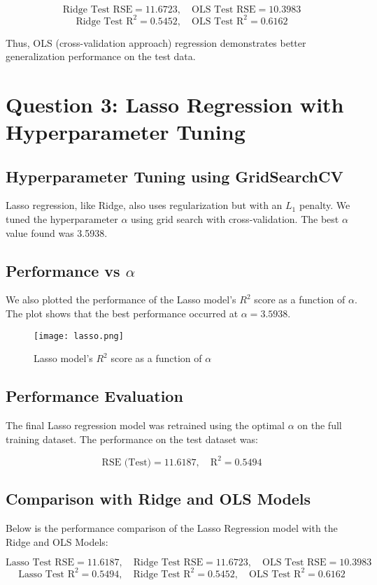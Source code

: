 \documentclass[a4paper,12pt]{article}
\begin{document}
\[
\text{Ridge Test RSE} = 11.6723, \quad \text{OLS Test RSE} = 10.3983
\]
\[
\text{Ridge Test R}^2 = 0.5452, \quad \text{OLS Test R}^2 = 0.6162
\]

Thus, OLS (cross-validation approach) regression demonstrates better generalization performance on the test data.

\section*{Question 3: Lasso Regression with Hyperparameter Tuning}

\subsection*{Hyperparameter Tuning using GridSearchCV}
Lasso regression, like Ridge, also uses regularization but with an \(L_1\) penalty. We tuned the hyperparameter \(\alpha\) using grid search with cross-validation. The best \(\alpha\) value found was 3.5938.

\subsection*{Performance vs \(\alpha\)}
We also plotted the performance of the Lasso model's $R^2$ score as a function of \(\alpha\). The plot shows that the best performance occurred at \(\alpha = 3.5938\).
\begin{figure}
    \centering
    \texttt{[image: lasso.png]}
    \caption{Lasso model's $R^2$ score as a function of \(\alpha\)}
\end{figure}
\subsection*{Performance Evaluation}
The final Lasso regression model was retrained using the optimal \(\alpha\) on the full training dataset. The performance on the test dataset was:

\[
\text{RSE (Test)} = 11.6187, \quad \text{R}^2 = 0.5494
\]

\subsection*{Comparison with Ridge and OLS Models}
Below is the performance comparison of the Lasso Regression model with the Ridge and OLS Models:

\[
\text{Lasso Test RSE} = 11.6187, \quad \text{Ridge Test RSE} = 11.6723, \quad \text{OLS Test RSE} = 10.3983
\]
\[
\text{Lasso Test R}^2 = 0.5494, \quad \text{Ridge Test R}^2 = 0.5452, \quad \text{OLS Test R}^2 = 0.6162
\]
\end{document}
